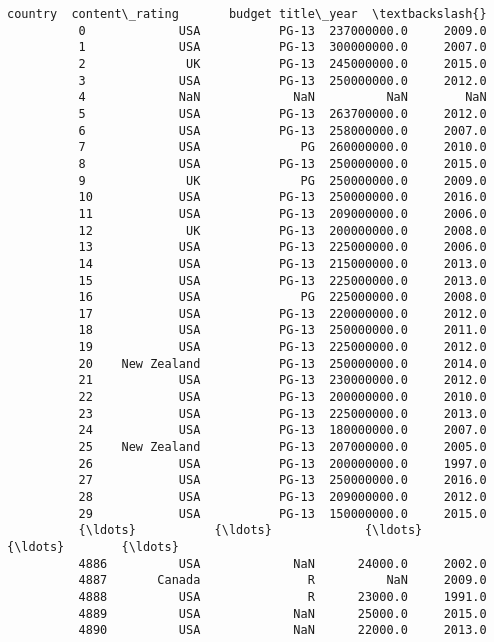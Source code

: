 \documentclass[11pt]{article}
\begin{document}
\begin{Verbatim}[commandchars=\\\{\}]
                    country  content\_rating       budget title\_year  \textbackslash{}
          0             USA           PG-13  237000000.0     2009.0   
          1             USA           PG-13  300000000.0     2007.0   
          2              UK           PG-13  245000000.0     2015.0   
          3             USA           PG-13  250000000.0     2012.0   
          4             NaN             NaN          NaN        NaN   
          5             USA           PG-13  263700000.0     2012.0   
          6             USA           PG-13  258000000.0     2007.0   
          7             USA              PG  260000000.0     2010.0   
          8             USA           PG-13  250000000.0     2015.0   
          9              UK              PG  250000000.0     2009.0   
          10            USA           PG-13  250000000.0     2016.0   
          11            USA           PG-13  209000000.0     2006.0   
          12             UK           PG-13  200000000.0     2008.0   
          13            USA           PG-13  225000000.0     2006.0   
          14            USA           PG-13  215000000.0     2013.0   
          15            USA           PG-13  225000000.0     2013.0   
          16            USA              PG  225000000.0     2008.0   
          17            USA           PG-13  220000000.0     2012.0   
          18            USA           PG-13  250000000.0     2011.0   
          19            USA           PG-13  225000000.0     2012.0   
          20    New Zealand           PG-13  250000000.0     2014.0   
          21            USA           PG-13  230000000.0     2012.0   
          22            USA           PG-13  200000000.0     2010.0   
          23            USA           PG-13  225000000.0     2013.0   
          24            USA           PG-13  180000000.0     2007.0   
          25    New Zealand           PG-13  207000000.0     2005.0   
          26            USA           PG-13  200000000.0     1997.0   
          27            USA           PG-13  250000000.0     2016.0   
          28            USA           PG-13  209000000.0     2012.0   
          29            USA           PG-13  150000000.0     2015.0   
          {\ldots}           {\ldots}             {\ldots}          {\ldots}        {\ldots}   
          4886          USA             NaN      24000.0     2002.0   
          4887       Canada               R          NaN     2009.0   
          4888          USA               R      23000.0     1991.0   
          4889          USA             NaN      25000.0     2015.0   
          4890          USA             NaN      22000.0     2013.0   

\end{Verbatim}
\end{document}
